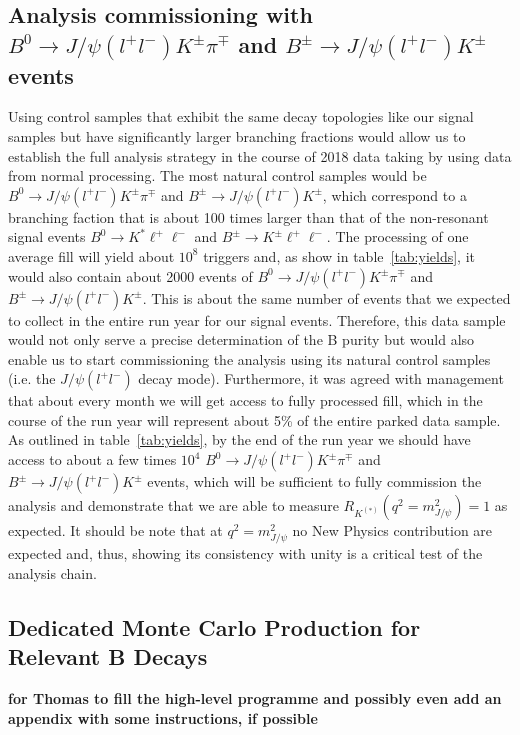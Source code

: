 \documentclass[a4paper,11pt]{article}
\begin{document}
\subsection{Analysis commissioning with $B^0\rightarrow J/\psi(l^+l^-) K^{\pm} \pi^{\mp}$ and $B^{\pm} \rightarrow J/\psi(l^+l^-)  K^{\pm}$ events} \label{jpsi} 
Using control samples that exhibit the same decay topologies like our signal samples but have significantly larger branching fractions would allow us to establish the full analysis strategy in the course of 2018 data taking by using data from normal processing. The most natural control samples would be $B^0\rightarrow J/\psi(l^+l^-) K^{\pm} \pi^{\mp}$ and $B^{\pm} \rightarrow J/\psi(l^+l^-)  K^{\pm}$, which correspond to a branching faction that is about 100 times larger than that of the non-resonant signal events $B^0\rightarrow K^* \ell^+\ell^-$  and $B^{\pm}\rightarrow K^{\pm} \ell^+\ell^-$.
The processing of one average fill will yield about $10^8 $ triggers and, as show in table~\ref{tab:yields}, it would also contain about 2000 events of $B^0\rightarrow J/\psi(l^+l^-) K^{\pm} \pi^{\mp}$ and $B^{\pm} \rightarrow J/\psi(l^+l^-)  K^{\pm}$. This is about the same number of events that we expected to collect in the entire run year for our signal events. Therefore, this data sample would not only serve a precise determination of the B purity but would also enable us to start commissioning the analysis using its natural control samples (i.e. the $J/\psi(l^+l^-)$ decay mode). 
Furthermore, it was agreed with management that about every month we will get access to fully processed fill, which in the course of the run year will represent about 5\% of the entire parked data sample. As outlined in table~\ref{tab:yields}, by the end of the run year we should have access to about a few times $10^4$ $B^0\rightarrow J/\psi(l^+l^-) K^{\pm} \pi^{\mp}$ and $B^{\pm} \rightarrow J/\psi(l^+l^-)  K^{\pm}$ events, which will be sufficient to fully commission the analysis and demonstrate that we are able to measure   $R_{K^{(*)}} (q^2 = m_{J/\psi}^2) =1$ as expected. It should be note that at $q^2 = m_{J/\psi}^2$ no New Physics contribution are expected and, thus, showing its consistency with unity is a critical test of the analysis chain.  

\subsection{Dedicated Monte Carlo Production for Relevant B Decays}\label{mc}
{\bf for Thomas to fill the high-level programme and possibly even add an appendix with some instructions, if possible} 
\end{document}
